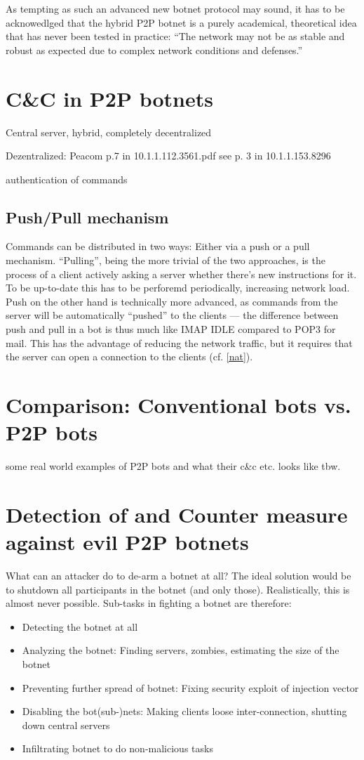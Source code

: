 \documentclass{llncs}
\begin{document}
As tempting as such an advanced new botnet protocol may sound, it has
to be acknowedlged that the hybrid P2P botnet is a purely academical,
theoretical idea that has never been tested in practice: ``The network
may not be as stable and robust as expected due to complex network
conditions and defenses.''\cite{wang2009systematic}

\section{C\&C in P2P botnets}
Central server, hybrid, completely decentralized

Dezentralized: Peacom p.7 in 10.1.1.112.3561.pdf
see p. 3 in 10.1.1.153.8296

authentication of commands

\subsection{Push/Pull mechanism}
\label{pushpull}
Commands can be distributed in two ways: Either via a push or a pull mechanism. ``Pulling'', being the more trivial of the two approaches, is the process of a client actively asking a server whether there's new instructions for it. To be up-to-date this has to be perforemd periodically, increasing network load.
Push on the other hand is technically more advanced, as commands from the server will be automatically ``pushed'' to the clients --- the difference between push and pull in a bot is thus much like IMAP IDLE compared to POP3 for mail. This has the advantage of reducing the network traffic, but it requires that the server can open a connection to the clients (cf. \ref{nat}). 

\section{Comparison: Conventional bots vs. P2P bots}
some real world examples of P2P bots and what their c\&c etc. looks like
tbw.

\section{Detection of and Counter measure against evil P2P botnets}
\label{counter-measure}
What can an attacker do to de-arm a botnet at all? The ideal solution would be to shutdown all participants in the botnet (and only those). Realistically, this is almost never possible. Sub-tasks in fighting a botnet are therefore:
\begin{itemize}
\item Detecting the botnet at all
\item Analyzing the botnet: Finding servers, zombies, estimating the size of the botnet
\item Preventing further spread of botnet: Fixing security exploit of injection vector
\item Disabling the bot(sub-)nets: Making clients loose inter-connection, shutting down central servers
\item Infiltrating botnet to do non-malicious tasks
\end{itemize}
\end{document}
